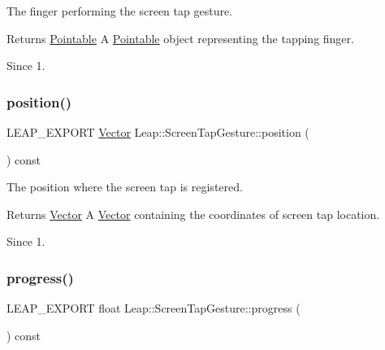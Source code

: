 The finger performing the screen tap gesture.


\begin{DoxyCodeInclude}
\end{DoxyCodeInclude}


\begin{DoxyReturn}{Returns}
\hyperlink{class_leap_1_1_pointable}{Pointable} A \hyperlink{class_leap_1_1_pointable}{Pointable} object representing the tapping finger. 
\end{DoxyReturn}
\begin{DoxySince}{Since}
1. 
\end{DoxySince}
\mbox{\label{class_leap_1_1_screen_tap_gesture_ab7f24af710fee9bd8111a9feaed76894}} 
\subsubsection{\texorpdfstring{position()}{position()}}
{\footnotesize\ttfamily L\+E\+A\+P\+\_\+\+E\+X\+P\+O\+RT \hyperlink{struct_leap_1_1_vector}{Vector} Leap\+::\+Screen\+Tap\+Gesture\+::position (\begin{DoxyParamCaption}{ }\end{DoxyParamCaption}) const}

The position where the screen tap is registered.


\begin{DoxyCodeInclude}
\end{DoxyCodeInclude}


\begin{DoxyReturn}{Returns}
\hyperlink{struct_leap_1_1_vector}{Vector} A \hyperlink{struct_leap_1_1_vector}{Vector} containing the coordinates of screen tap location. 
\end{DoxyReturn}
\begin{DoxySince}{Since}
1. 
\end{DoxySince}
\mbox{\label{class_leap_1_1_screen_tap_gesture_a3c5dd0ca7c5d5c9e35ae6234a727ca88}} 
\subsubsection{\texorpdfstring{progress()}{progress()}}
{\footnotesize\ttfamily L\+E\+A\+P\+\_\+\+E\+X\+P\+O\+RT float Leap\+::\+Screen\+Tap\+Gesture\+::progress (\begin{DoxyParamCaption}{ }\end{DoxyParamCaption}) const}

